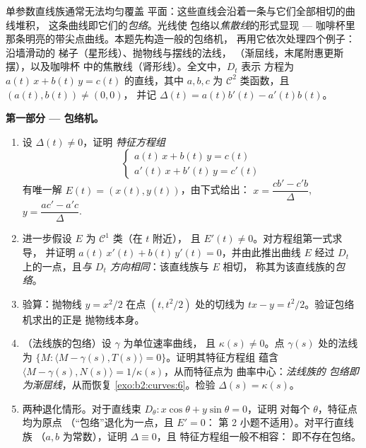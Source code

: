\begin{problem}\label{pb:b2:curves:1}
单参数直线族通常无法均匀覆盖
平面：这些直线会沿着一条与它们全部相切的曲线堆积，
这条曲线即它们的\emph{包络}。光线使
包络以\emph{焦散线}的形式显现 --- 咖啡杯里
那条明亮的带尖点曲线。本题先构造一般的包络机，
再用它依次处理四个例子：沿墙滑动的
梯子（星形线）、抛物线与摆线的法线，
（渐屈线，末尾附惠更斯摆），以及咖啡杯
中的焦散线（肾形线）。全文中，$D_t$ 表示
方程为 $a(t)\,x + b(t)\,y = c(t)$ 的直线，其中 $a, b, c$
为 $\mathcal C^2$ 类函数，且 $(a(t), b(t)) \neq (0,0)$，
并记 $\Delta(t) = a(t)b'(t) - a'(t)b(t)$。

\medskip
\noindent\textbf{第一部分 --- 包络机。}
\begin{enumerate}
  \item 设 $\Delta(t) \neq 0$，证明
        \emph{特征方程组}
        \[
        \begin{cases} a(t)\,x + b(t)\,y = c(t)\\
        a'(t)\,x + b'(t)\,y = c'(t)\end{cases}
        \]
        有唯一解 $E(t) = (x(t), y(t))$，由下式给出：
        $x = \dfrac{cb' - c'b}{\Delta}$, $y = \dfrac{ac' -
        a'c}{\Delta}$.
  \item 进一步假设 $E$ 为 $\mathcal C^1$ 类（在 $t$ 附近），
        且 $E'(t) \neq 0$。对方程组第一式求导，
        并证明 $a(t)\,x'(t) +
        b(t)\,y'(t) = 0$，并由此推出曲线 $E$
        经过 $D_t$ 上的一点，且\emph{与
        $D_t$ 方向相同}：该直线族与 $E$ 相切，
        称其为该直线族的\emph{包络}。
  \item 验算：抛物线 $y =
        x^2/2$ 在点 $(t, t^2/2)$ 处的切线为 $tx - y =
        t^2/2$。验证包络机求出的正是
        抛物线本身。
  \item （法线族的包络）设 $\gamma$ 为单位速率曲线，
        且 $\kappa(s) \neq 0$。点 $\gamma(s)$ 处的法线
        为 $\{M : \langle M - \gamma(s), T(s)
        \rangle = 0\}$。证明其特征方程组
        蕴含 $\langle M - \gamma(s), N(s)\rangle =
        1/\kappa(s)$，从而特征点为
        曲率中心：\emph{法线族的
        包络即为渐屈线}，从而恢复
        \cref{exo:b2:curves:6}。检验 $\Delta(s) =
        \kappa(s)$。
  \item 两种退化情形。对于直线束 $D_\theta : x\cos
        \theta + y\sin\theta = 0$，证明
        对每个 $\theta$，特征点均为原点
        （“包络”退化为一点，且 $E' = 0$：
        第 2 小题不适用）。对平行直线族
        （$a, b$ 为常数），证明 $\Delta \equiv 0$，且
        特征方程组一般不相容：
        即不存在包络。
\end{enumerate}


\end{problem}
